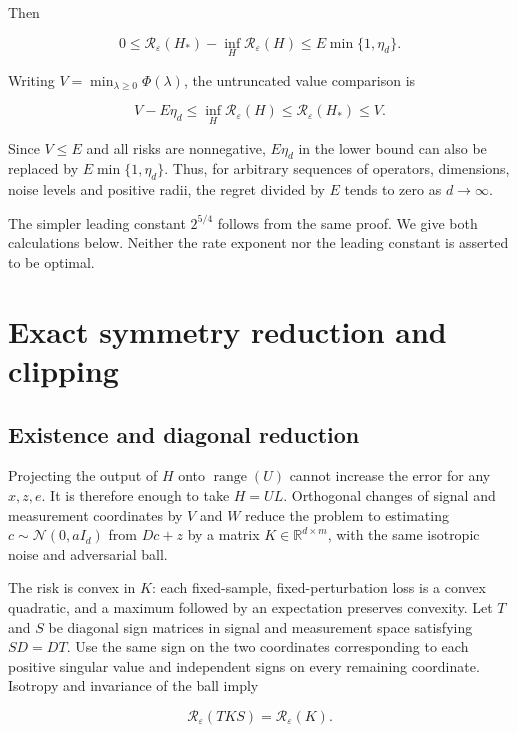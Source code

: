 \documentclass[11pt,a4paper]{article}
\begin{document}
Then

\[
0\le\mathcal R_\varepsilon(H_*)-\inf_H\mathcal R_\varepsilon(H)
\le E\min\{1,\eta_d\}.
\tag{7}
\]

Writing \(V=\min_{\lambda\ge0}\Phi(\lambda)\), the untruncated value
comparison is

\[
V-E\eta_d
\le\inf_H\mathcal R_\varepsilon(H)
\le\mathcal R_\varepsilon(H_*)\le V.
\tag{8}
\]

Since \(V\le E\) and all risks are nonnegative, \(E\eta_d\) in the lower
bound can also be replaced by \(E\min\{1,\eta_d\}\). Thus, for arbitrary
sequences of operators, dimensions, noise levels and positive radii, the
regret divided by \(E\) tends to zero as \(d\to\infty\).

The simpler leading constant \(2^{5/4}\) follows from the same proof. We
give both calculations below. Neither the rate exponent nor the leading
constant is asserted to be optimal.

\hypertarget{exact-symmetry-reduction-and-clipping}{%
\section{Exact symmetry reduction and
clipping}\label{exact-symmetry-reduction-and-clipping}}

\hypertarget{existence-and-diagonal-reduction}{%
\subsection{Existence and diagonal
reduction}\label{existence-and-diagonal-reduction}}

Projecting the output of \(H\) onto \(\operatorname{range}(U)\) cannot
increase the error for any \(x,z,e\). It is therefore enough to take
\(H=UL\). Orthogonal changes of signal and measurement coordinates by
\(V\) and \(W\) reduce the problem to estimating
\(c\sim\mathcal N(0,aI_d)\) from \(Dc+z\) by a matrix
\(K\in\mathbb R^{d\times m}\), with the same isotropic noise and
adversarial ball.

The risk is convex in \(K\): each fixed-sample, fixed-perturbation loss
is a convex quadratic, and a maximum followed by an expectation
preserves convexity. Let \(T\) and \(S\) be diagonal sign matrices in
signal and measurement space satisfying \(SD=DT\). Use the same sign on
the two coordinates corresponding to each positive singular value and
independent signs on every remaining coordinate. Isotropy and invariance
of the ball imply

\[
\mathcal R_\varepsilon(TKS)=\mathcal R_\varepsilon(K).
\]
\end{document}
